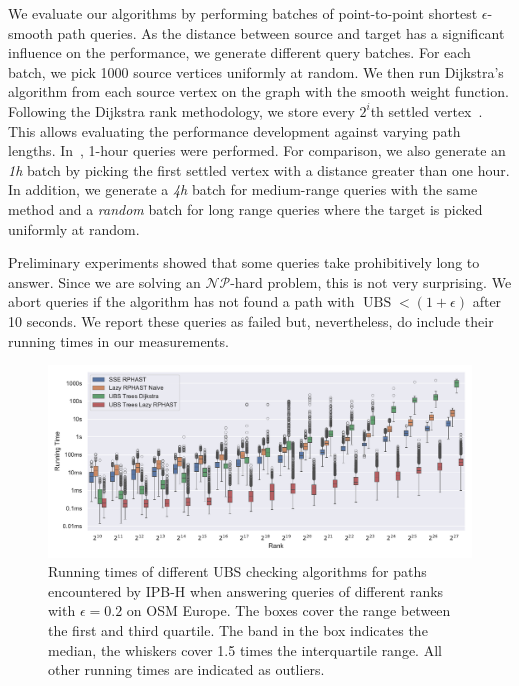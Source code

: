 \documentclass[a4paper,UKenglish,cleveref, autoref, thm-restate]{lipics-v2021}
\newcommand*{\ubs}{\operatorname{UBS}}
\begin{document}
We evaluate our algorithms by performing batches of point-to-point shortest $\epsilon$-smooth path queries.
As the distance between source and target has a significant influence on the performance, we generate different query batches.
For each batch, we pick 1000 source vertices uniformly at random.
We then run Dijkstra's algorithm from each source vertex on the graph with the smooth weight function.
Following the Dijkstra rank methodology, we store every $2^i$th settled vertex~\cite{ss-hhhes-05}.
This allows evaluating the performance development against varying path lengths.
In~\cite{dss-tarrn-18}, 1-hour queries were performed.
For comparison, we also generate an \emph{1h} batch by picking the first settled vertex with a distance greater than one hour.
In addition, we generate a \emph{4h} batch for medium-range queries with the same method and a \emph{random} batch for long range queries where the target is picked uniformly at random.

Preliminary experiments showed that some queries take prohibitively long to answer.
Since we are solving an $\mathcal{NP}$-hard problem, this is not very surprising.
We abort queries if the algorithm has not found a path with $\ubs < (1+\epsilon)$ after 10 seconds.
We report these queries as failed but, nevertheless, do include their running times in our measurements.

\begin{figure}
\centering
\includegraphics[width=\linewidth]{fig/ubs_perf.pdf}
\caption{
Running times of different UBS checking algorithms for paths encountered by IPB-H when answering queries of different ranks with $\epsilon = 0.2$ on OSM Europe.
The boxes cover the range between the first and third quartile.
The band in the box indicates the median, the whiskers cover 1.5 times the interquartile range.
All other running times are indicated as outliers.
}\label{fig:ubs_perf}
\end{figure}
\end{document}
